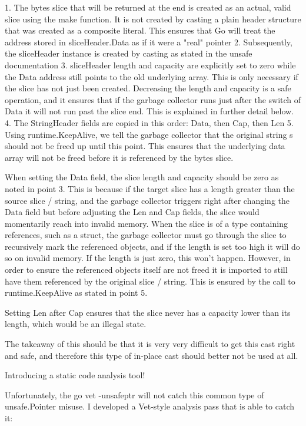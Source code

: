  1. The bytes slice that will be returned at the end is created as an actual, valid slice using the make function.
    It is not created by casting a plain header structure that was created as a composite literal. This ensures that
    Go will treat the address stored in sliceHeader.Data as if it were a "real" pointer
 2. Subsequently, the sliceHeader instance is created by casting as stated in the unsafe documentation
 3. sliceHeader length and capacity are explicitly set to zero while the Data address still points to the old
    underlying array. This is only necessary if the slice has not just been created. Decreasing the length and capacity
    is a safe operation, and it ensures that if the garbage collector runs just after the switch of Data it will not
    run past the slice end. This is explained in further detail below.
 4. The StringHeader fields are copied in this order: Data, then Cap, then Len
 5. Using runtime.KeepAlive, we tell the garbage collector that the original string s should not be freed up until
    this point. This ensures that the underlying data array will not be freed before it is referenced by the
    bytes slice.

When setting the Data field, the slice length and capacity should be zero as noted in point 3. This is because if the
target slice has a length greater than the source slice / string, and the garbage collector triggers right after
changing the Data field but before adjusting the Len and Cap fields, the slice would momentarily reach into
invalid memory. When the slice is of a type containing references, such as a struct, the garbage collector must go
through the slice to recursively mark the referenced objects, and if the length is set too high it will do so on invalid
memory. If the length is just zero, this won't happen. However, in order to ensure the referenced objects itself are not
freed it is imported to still have them referenced by the original slice / string. This is ensured by the call to
runtime.KeepAlive as stated in point 5.

Setting Len after Cap ensures that the slice never has a capacity lower than its length, which would be an illegal
state.

The takeaway of this should be that it is very very difficult to get this cast right and safe, and therefore this type
of in-place cast should better not be used at all.


 Introducing a static code analysis tool!

Unfortunately, the go vet -unsafeptr will not catch this common type of unsafe.Pointer misuse. I developed a Vet-style
analysis pass that is able to catch it:

